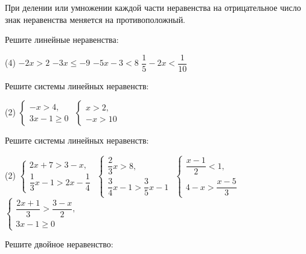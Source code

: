 
\begin{class}[number=6]
	\begin{definit}
		При делении или умножении каждой части неравенства на отрицательное число знак неравенства меняется на противоположный. 
	\end{definit}
	\begin{listofex}[resume]
		\item Решите линейные неравенства:
		\begin{tasks}(4)
			\task \( -2x>2 \)
			\task \( -3x\leq-9 \)
			\task \( -5x-3<8 \)
			\task \( \dfrac{1}{5}-2x<\dfrac{1}{10} \)
		\end{tasks}
		\item Решите системы линейных неравенств:
		\begin{tasks}(2)
			\task \( \left\{
			\begin{array}{l}
				-x>4,\\
				3x-1\geq0
			\end{array}
			\right. \)
			\task \( \left\{
			\begin{array}{l}
				x>2,\\
				-x>10
			\end{array}
			\right. \)
		\end{tasks}
		\item Решите системы линейных неравенств:
		\begin{tasks}(2)
			\task \( \left\{
			\begin{array}{l}
				2x+7>3-x,\\
				\dfrac{1}{3}x-1>2x-\dfrac{1}{4}
			\end{array}
			\right. \)
			\task \( \left\{
			\begin{array}{l}
				\dfrac{2}{3}x>8,\\[1em]
				\dfrac{3}{4}x-1>\dfrac{3}{5}x-1
			\end{array}
			\right. \)
			\task \( \left\{
			\begin{array}{l}
				\dfrac{x-1}{2}<1,\\
				4-x>\dfrac{x-5}{3}
			\end{array}
			\right. \)
			\task \( \left\{
			\begin{array}{l}
				\dfrac{2x+1}{3}>\dfrac{3-x}{2},\\
				3x-1\geq0
			\end{array}
			\right. \)
		\end{tasks}
		\item Решите двойное неравенство:

\end{listofex}
\end{class}
